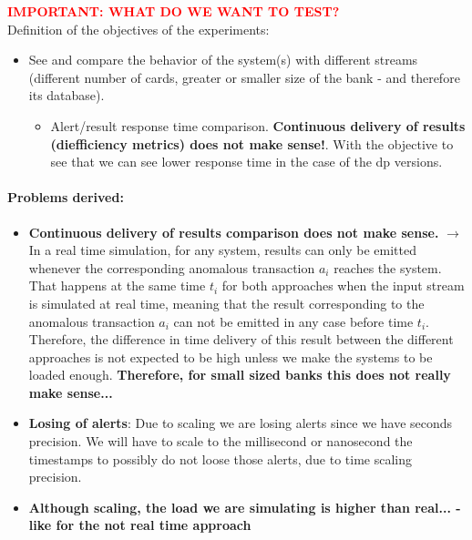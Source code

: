 \begin{tcolorbox}[colframe=red!75]
\textcolor{red}{\textbf{IMPORTANT: WHAT DO WE WANT TO TEST?\\}}
Definition of the objectives of the experiments:
\begin{itemize}
    \item See and compare the behavior of the system(s) with different streams (different number of cards, greater or smaller size of the bank - and therefore its database). \\
    \begin{itemize}
        \item Alert/result response time comparison. \textbf{Continuous delivery of results (diefficiency metrics) does not make sense!}. With the objective to see that we can see lower response time in the case of the dp versions.
    \end{itemize}
\end{itemize}
\end{tcolorbox}


\paragraph{Problems derived:\\}
\begin{itemize}
    \item \textbf{Continuous delivery of results comparison does not make sense.} $\rightarrow$ In a real time simulation, for any system, results can only be emitted whenever the corresponding anomalous transaction $a_i$ reaches the system. That happens at the same time $t_i$ for both approaches when the input stream is simulated at real time, meaning that the result corresponding to the anomalous transaction $a_i$ can not be emitted in any case before time $t_i$. Therefore, the difference in time delivery of this result between the different approaches is not expected to be high unless we make the systems to be loaded enough. \textbf{Therefore, for small sized banks this does not really make sense...}
    \item \textbf{Losing of alerts}: Due to scaling we are losing alerts since we have seconds precision. We will have to scale to the millisecond or nanosecond the timestamps to possibly do not loose those alerts, due to time scaling precision.
    \item \textbf{Although scaling, the load we are simulating is higher than real... - like for the not real time approach}
\end{itemize}

